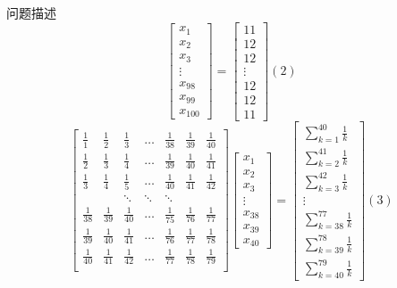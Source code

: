 \documentclass{article}
\begin{document}
\begin{section}{问题描述}
$$    \begin{bmatrix}
        x_1\\ x_2 \\ x_3 \\ \vdots \\ x_{98}\\x_{99}\\x_{100}
    \end{bmatrix}=
    \begin{bmatrix}
        11 \\ 12 \\ 12 \\ \vdots \\ 12 \\ 12 \\11
    \end{bmatrix}(2)
    $$
    $$ \begin{bmatrix}
        \frac{1}{1} & \frac{1}{2} & \frac{1}{3} & \dots & \frac{1}{38}&\frac{1}{39} & \frac{1}{40}\\
        \frac{1}{2} & \frac{1}{3} & \frac{1}{4} & \dots & \frac{1}{39}&\frac{1}{40} & \frac{1}{41}\\
        \frac{1}{3} & \frac{1}{4} & \frac{1}{5} & \dots & \frac{1}{40}&\frac{1}{41} & \frac{1}{42}\\
         & & \ddots & \ddots & \ddots& &\\
        \frac{1}{38} & \frac{1}{39} & \frac{1}{40} & \dots & \frac{1}{75}&\frac{1}{76} & \frac{1}{77}\\
        \frac{1}{39} & \frac{1}{40} & \frac{1}{41} & \dots & \frac{1}{76}&\frac{1}{77} & \frac{1}{78}\\
        \frac{1}{40} & \frac{1}{41} & \frac{1}{42} & \dots & \frac{1}{77}&\frac{1}{78} & \frac{1}{79}\\
    \end{bmatrix}
    \begin{bmatrix}
        x_1\\ x_2 \\ x_3 \\ \vdots \\ x_{38}\\x_{39}\\x_{40}
    \end{bmatrix}=
    \begin{bmatrix}
        \sum_{k=1}^{40} \frac{1}{k} \\ \sum_{k=2}^{41} \frac{1}{k} \\ \sum_{k=3}^{42} \frac{1}{k} \\ \vdots \\ \sum_{k=38}^{77} \frac{1}{k} \\ \sum_{k=39}^{78} \frac{1}{k} \\\sum_{k=40}^{79} \frac{1}{k}
    \end{bmatrix}(3)
    $$


\end{section}
\end{document}
